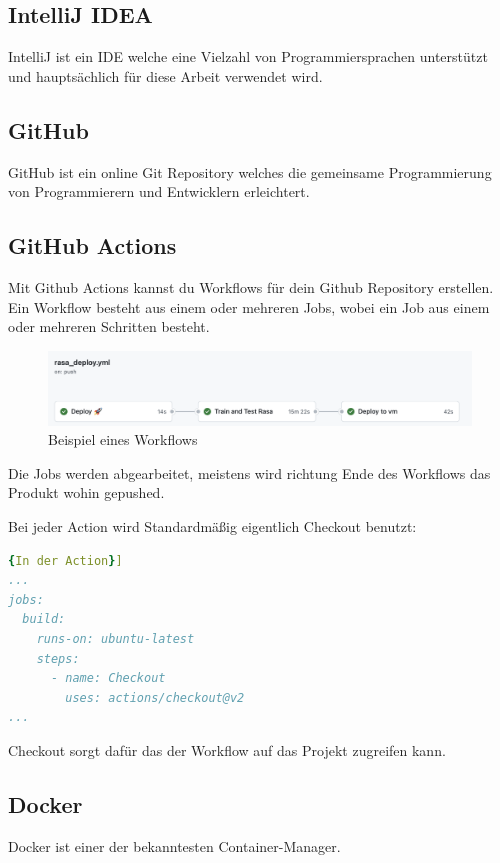 \subsection{IntelliJ IDEA}
IntelliJ ist ein IDE welche eine Vielzahl von Programmiersprachen unterstützt und hauptsächlich für diese Arbeit verwendet wird.

\subsection{GitHub}
GitHub ist ein online Git Repository welches die gemeinsame Programmierung von Programmierern und Entwicklern erleichtert.

\subsection{GitHub Actions}\label{subsec:github-actions}
Mit Github Actions kannst du Workflows für dein Github Repository erstellen.
Ein Workflow besteht aus einem oder mehreren Jobs, wobei ein Job aus einem oder mehreren Schritten besteht.

\begin{figure}[hbt!]
    \centering
    \includegraphics[scale=0.5]{pics/ghActions}
    \caption{Beispiel eines Workflows}
    \label{fig:impl:ghActions}
\end{figure}

Die Jobs werden abgearbeitet, meistens wird richtung Ende des Workflows das Produkt wohin gepushed.

Bei jeder Action wird Standardmäßig eigentlich Checkout benutzt:

\begin{lstlisting}[language=yaml,label={lst:checkout},caption={In der Action}]{In der Action}]
...
jobs:
  build:
    runs-on: ubuntu-latest
    steps:
      - name: Checkout
        uses: actions/checkout@v2
...
\end{lstlisting}

Checkout sorgt dafür das der Workflow auf das Projekt zugreifen kann.
\subsection{Docker}
Docker ist einer der bekanntesten Container-Manager.

